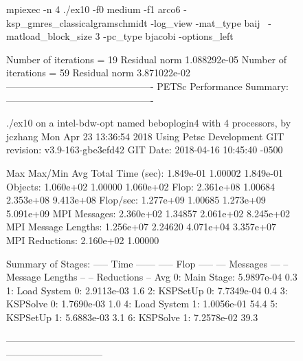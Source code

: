 \begin{figure}[tb]
  \begin{outputlisting}[\tiny\ttfamily]
mpiexec -n 4 ./ex10 -f0 medium -f1 arco6 -ksp_gmres_classicalgramschmidt -log_view -mat_type baij \
            -matload_block_size 3 -pc_type bjacobi -options_left

Number of iterations = 19
Residual norm 1.088292e-05
Number of iterations = 59
Residual norm 3.871022e-02
---------------------------------------------- PETSc Performance Summary: ----------------------------------------------

./ex10 on a intel-bdw-opt named beboplogin4 with 4 processors, by jczhang Mon Apr 23 13:36:54 2018
Using Petsc Development GIT revision: v3.9-163-gbe3efd42  GIT Date: 2018-04-16 10:45:40 -0500

                         Max       Max/Min        Avg      Total
Time (sec):           1.849e-01      1.00002   1.849e-01
Objects:              1.060e+02      1.00000   1.060e+02
Flop:                 2.361e+08      1.00684   2.353e+08  9.413e+08
Flop/sec:            1.277e+09      1.00685   1.273e+09  5.091e+09
MPI Messages:         2.360e+02      1.34857   2.061e+02  8.245e+02
MPI Message Lengths:  1.256e+07      2.24620   4.071e+04  3.357e+07
MPI Reductions:       2.160e+02      1.00000

Summary of Stages:   ----- Time ------  ----- Flop -----  --- Messages ---  -- Message Lengths --  -- Reductions --
                        Avg     %
 0:      Main Stage: 5.9897e-04   0.3%
 1:   Load System 0: 2.9113e-03   1.6%
 2:      KSPSetUp 0: 7.7349e-04   0.4%
 3:      KSPSolve 0: 1.7690e-03   1.0%
 4:   Load System 1: 1.0056e-01  54.4%
 5:      KSPSetUp 1: 5.6883e-03   3.1%
 6:      KSPSolve 1: 7.2578e-02  39.3%

------------------------------------------------------------------------------------------------------------------------


\end{outputlisting}
\end{figure}
